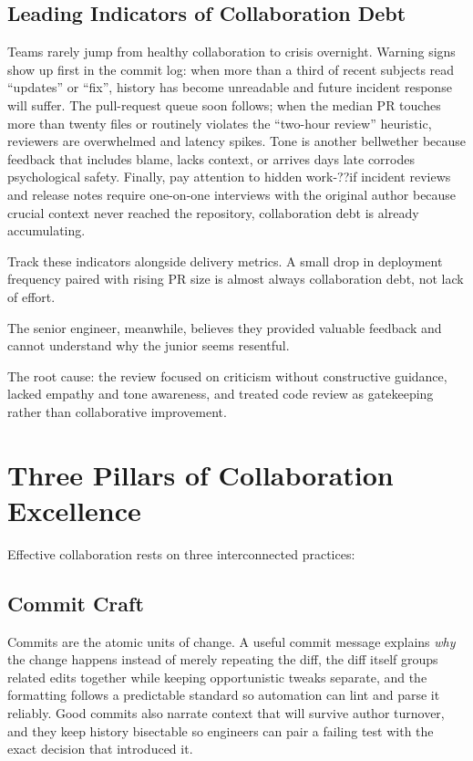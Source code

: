 \subsection{Leading Indicators of Collaboration Debt}
Teams rarely jump from healthy collaboration to crisis overnight. Warning signs show up first in the commit log: when more than a third of recent subjects read ``updates'' or ``fix'', history has become unreadable and future incident response will suffer. The pull-request queue soon follows; when the median PR touches more than twenty files or routinely violates the ``two-hour review'' heuristic, reviewers are overwhelmed and latency spikes. Tone is another bellwether because feedback that includes blame, lacks context, or arrives days late corrodes psychological safety. Finally, pay attention to hidden work-??if incident reviews and release notes require one-on-one interviews with the original author because crucial context never reached the repository, collaboration debt is already accumulating.

\begin{notebox}
Track these indicators alongside delivery metrics. A small drop in deployment frequency paired with rising PR size is almost always collaboration debt, not lack of effort.
\end{notebox}

The senior engineer, meanwhile, believes they provided valuable feedback and cannot understand why the junior seems resentful.

The root cause: the review focused on criticism without constructive guidance, lacked empathy and tone awareness, and treated code review as gatekeeping rather than collaborative improvement.

\section{Three Pillars of Collaboration Excellence}

Effective collaboration rests on three interconnected practices:

\subsection{Commit Craft}
Commits are the atomic units of change. A useful commit message explains \textit{why} the change happens instead of merely repeating the diff, the diff itself groups related edits together while keeping opportunistic tweaks separate, and the formatting follows a predictable standard so automation can lint and parse it reliably. Good commits also narrate context that will survive author turnover, and they keep history bisectable so engineers can pair a failing test with the exact decision that introduced it.

